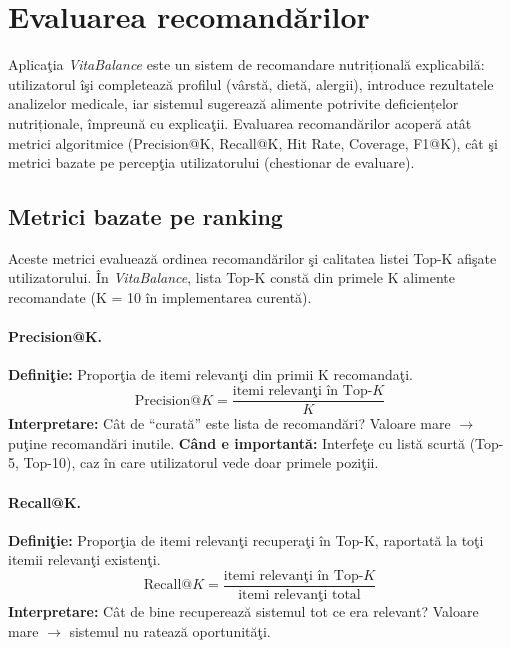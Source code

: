 \documentclass[12pt,a4paper]{article}
\begin{document}
\newpage
\section*{Evaluarea recomandărilor}

Aplica\c{t}ia \textit{VitaBalance} este un sistem de recomandare nutrițional\u{a} explicabil\u{a}: utilizatorul \^{i}\c{s}i completeaz\u{a} profilul (v\^{a}rst\u{a}, diet\u{a}, alergii), introduce rezultatele analizelor medicale, iar sistemul sugereaz\u{a} alimente potrivite deficiențelor nutriționale, \^{i}mpreun\u{a} cu explica\c{t}ii. Evaluarea recomandărilor acoper\u{a} at\^{a}t metrici algoritmice (Precision@K, Recall@K, Hit Rate, Coverage, F1@K), c\^{a}t \c{s}i metrici bazate pe percep\c{t}ia utilizatorului (chestionar de evaluare).

\subsection*{Metrici bazate pe ranking}

Aceste metrici evalueaz\u{a} ordinea recomandărilor \c{s}i calitatea listei Top-K afi\c{s}ate utilizatorului. \^{I}n \textit{VitaBalance}, lista Top-K const\u{a} din primele K alimente recomandate (K = 10 \^{i}n implementarea curent\u{a}).

\paragraph{Precision@K.}
\textbf{Defini\c{t}ie:} Propor\c{t}ia de itemi relevan\c{t}i din primii K recomanda\c{t}i.
\begin{equation}
  \text{Precision@}K = \frac{\text{itemi relevan\c{t}i \^{i}n Top-}K}{K}
\end{equation}
\textbf{Interpretare:} C\^{a}t de ``curat\u{a}'' este lista de recomandări? Valoare mare $\rightarrow$ pu\c{t}ine recomandări inutile. \textbf{C\^{a}nd e important\u{a}:} Interfe\c{t}e cu list\u{a} scurt\u{a} (Top-5, Top-10), caz \^{i}n care utilizatorul vede doar primele pozi\c{t}ii.

\paragraph{Recall@K.}
\textbf{Defini\c{t}ie:} Propor\c{t}ia de itemi relevan\c{t}i recupera\c{t}i \^{i}n Top-K, raportat\u{a} la to\c{t}i itemii relevan\c{t}i existen\c{t}i.
\begin{equation}
  \text{Recall@}K = \frac{\text{itemi relevan\c{t}i \^{i}n Top-}K}{\text{itemi relevan\c{t}i total}}
\end{equation}
\textbf{Interpretare:} C\^{a}t de bine recupereaz\u{a} sistemul tot ce era relevant? Valoare mare $\rightarrow$ sistemul nu rateaz\u{a} oportunit\u{a}\c{t}i.
\end{document}
